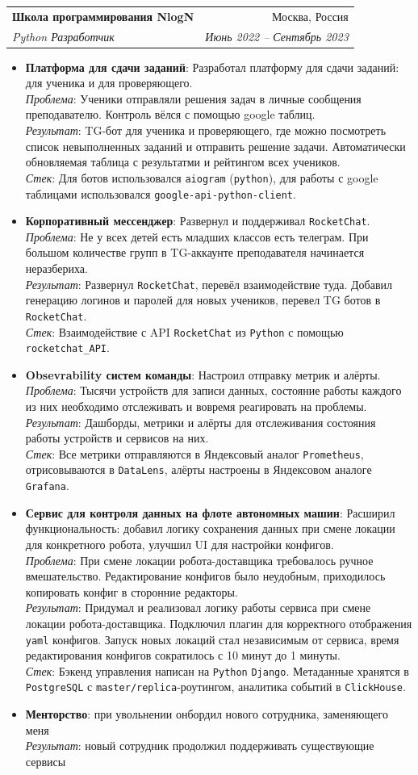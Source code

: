 \documentclass[letterpaper,11pt]{article}
\makeatletter
\newcommand{\resumeItemDetailed}[5]{
  \item\small{
    \textbf{#1}: #2 \\[3pt]
    \textit{Проблема}: #3 \\[3pt]
    \textit{Результат}: #4 \\[3pt]
    \textit{Стек}: #5
    \vspace{-2pt}
  }
}
\newcommand{\resumeSummary}[3]{
  \item\small{
    \textbf{#1}: #2 \\[3pt]
    \textit{Результат}: #3
    \vspace{-2pt}
  }
}
\newcommand{\tech}[1]{\texttt{#1}}
\newcommand{\resumeSubheading}[4]{
  \vspace{-1pt}\item
    \begin{tabular*}{0.97\textwidth}[t]{l@{\extracolsep{\fill}}r}
      \textbf{#1} & #2 \\
      \textit{\small #3} & \textit{\small #4} \\
    \end{tabular*}\vspace{-5pt}
}
\newcommand{\resumeItemListStart}{\begin{itemize}}
\newcommand{\resumeItemListEnd}{\end{itemize}\vspace{-5pt}}
\makeatother
\begin{document}
      \resumeSubheading
      {Школа программирования NlogN}{Москва, Россия}
      {Python Разработчик}{Июнь 2022 -- Сентябрь 2023}
      \resumeItemListStart
        \resumeItemDetailed{Платформа для сдачи заданий}
          {Разработал платформу для сдачи заданий: для ученика и для проверяющего.}
          {Ученики отправляли решения задач в личные сообщения преподавателю. Контроль вёлся с помощью google таблиц.}
          {TG-бот для ученика и проверяющего, где можно посмотреть список невыполненных заданий и отправить решение задачи. Автоматически обновляемая таблица с результатми и рейтингом всех учеников.}
          {Для ботов использовался \tech{aiogram} (\tech{python}), для работы с google таблицами использовался \tech{google-api-python-client}.}
        \resumeItemDetailed{Корпоративный мессенджер}
          {Развернул и поддерживал \tech{RocketChat}.}
          {Не у всех детей есть младших классов есть телеграм. При большом количестве групп в TG-аккаунте преподавателя начинается неразбериха.}
          {Развернул \tech{RocketChat}, перевёл взаимодействие туда. Добавил генерацию логинов и паролей для новых учеников, перевел TG ботов в \tech{RocketChat}.}
          {Взаимодействие с API \tech{RocketChat} из \tech{Python} с помощью \tech{rocketchat\_API}.}
        \resumeItemDetailed{Obsevrability систем команды}
          {Настроил отправку метрик и алёрты.}
          {Тысячи устройств для записи данных, состояние работы каждого из них необходимо отслеживать и вовремя реагировать на проблемы.}
          {Дашборды, метрики и алёрты для отслеживания состояния работы устройств и сервисов на них.}
          {Все метрики отправляются в Яндексовый аналог \tech{Prometheus}, отрисовываются в \tech{DataLens}, алёрты настроены в Яндексовом аналоге \tech{Grafana}.}
        \resumeItemDetailed{Сервис для контроля данных на флоте автономных машин}
          {Расширил функциональность: добавил логику сохранения данных при смене локации для конкретного робота, улучшил UI для настройки конфигов.}
          {При смене локации робота-доставщика требовалось ручное вмешательство. Редактирование конфигов было неудобным, приходилось копировать конфиг в сторонние редакторы.}
          {Придумал и реализовал логику работы сервиса при смене локации робота-доставщика. Подключил плагин для корректного отображения \tech{yaml} конфигов. Запуск новых локаций стал независимым от сервиса, время редактирования конфигов сократилось с 10 минут до 1 минуты.}
          {Бэкенд управления написан на \tech{Python} \tech{Django}. Метаданные хранятся в \tech{PostgreSQL} с \tech{master/replica}-роутингом,
          аналитика событий в \tech{ClickHouse}.}
        \resumeSummary{Менторство}
          {при увольнении онбордил нового сотрудника, заменяющего меня}
          {новый сотрудник продолжил поддерживать существующие сервисы}
      \resumeItemListEnd
\end{document}
